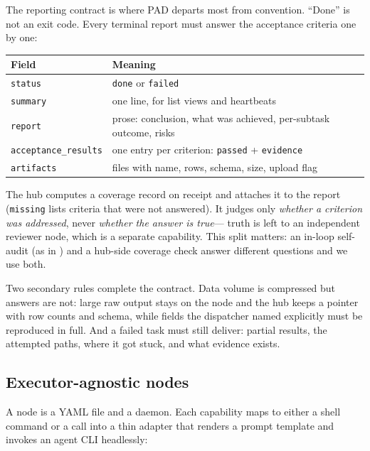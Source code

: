 \documentclass{article}
\begin{document}
The reporting contract is where PAD departs most from convention. ``Done'' is not an
exit code. Every terminal report must answer the acceptance criteria one by one:

\begin{center}
\small
\begin{tabular}{@{}p{}p{}@{}}
\toprule
Field & Meaning \\
\midrule
\texttt{status} & \texttt{done} or \texttt{failed} \\
\texttt{summary} & one line, for list views and heartbeats \\
\texttt{report} & prose: conclusion, what was achieved, per-subtask outcome, risks \\
\texttt{acceptance\_\allowbreak results} & one entry per criterion: \texttt{passed} + \texttt{evidence} \\
\texttt{artifacts} & files with name, rows, schema, size, upload flag \\
\bottomrule
\end{tabular}
\end{center}

The hub computes a coverage record on receipt and attaches it to the report
(\texttt{missing} lists criteria that were not answered). It judges only
\emph{whether a criterion was addressed}, never \emph{whether the answer is true}---
truth is left to an independent reviewer node, which is a separate capability. This
split matters: an in-loop self-audit (as in \cite{longhorizon2026}) and a hub-side
coverage check answer different questions and we use both.

Two secondary rules complete the contract. Data volume is compressed but answers are
not: large raw output stays on the node and the hub keeps a pointer with row counts
and schema, while fields the dispatcher named explicitly must be reproduced in full.
And a failed task must still deliver: partial results, the attempted paths, where it
got stuck, and what evidence exists.

\subsection{Executor-agnostic nodes}
\label{sec:exec}

A node is a YAML file and a daemon. Each capability maps to either a shell command or
a call into a thin adapter that renders a prompt template and invokes an agent CLI
headlessly:
\end{document}

